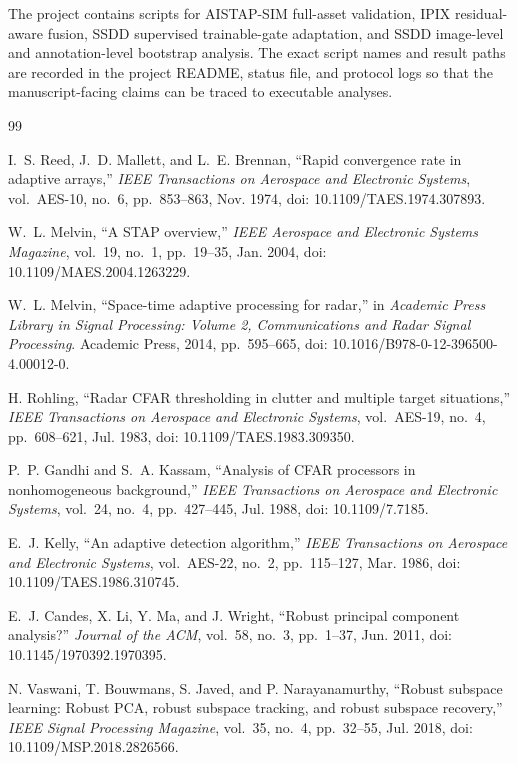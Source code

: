 \documentclass[journal]{IEEEtran}
\begin{document}
The project contains scripts for AISTAP-SIM full-asset validation, IPIX residual-aware fusion, SSDD supervised trainable-gate adaptation, and SSDD image-level and annotation-level bootstrap analysis. The exact script names and result paths are recorded in the project README, status file, and protocol logs so that the manuscript-facing claims can be traced to executable analyses.

\begin{thebibliography}{99}

I.~S. Reed, J.~D. Mallett, and L.~E. Brennan, ``Rapid convergence rate in adaptive arrays,'' \emph{IEEE Transactions on Aerospace and Electronic Systems}, vol.~AES-10, no.~6, pp.~853--863, Nov. 1974, doi: 10.1109/TAES.1974.307893.

W.~L. Melvin, ``A STAP overview,'' \emph{IEEE Aerospace and Electronic Systems Magazine}, vol.~19, no.~1, pp.~19--35, Jan. 2004, doi: 10.1109/MAES.2004.1263229.

W.~L. Melvin, ``Space-time adaptive processing for radar,'' in \emph{Academic Press Library in Signal Processing: Volume 2, Communications and Radar Signal Processing}. Academic Press, 2014, pp.~595--665, doi: 10.1016/B978-0-12-396500-4.00012-0.

H. Rohling, ``Radar CFAR thresholding in clutter and multiple target situations,'' \emph{IEEE Transactions on Aerospace and Electronic Systems}, vol.~AES-19, no.~4, pp.~608--621, Jul. 1983, doi: 10.1109/TAES.1983.309350.

P.~P. Gandhi and S.~A. Kassam, ``Analysis of CFAR processors in nonhomogeneous background,'' \emph{IEEE Transactions on Aerospace and Electronic Systems}, vol.~24, no.~4, pp.~427--445, Jul. 1988, doi: 10.1109/7.7185.

E.~J. Kelly, ``An adaptive detection algorithm,'' \emph{IEEE Transactions on Aerospace and Electronic Systems}, vol.~AES-22, no.~2, pp.~115--127, Mar. 1986, doi: 10.1109/TAES.1986.310745.

E.~J. Candes, X. Li, Y. Ma, and J. Wright, ``Robust principal component analysis?'' \emph{Journal of the ACM}, vol.~58, no.~3, pp.~1--37, Jun. 2011, doi: 10.1145/1970392.1970395.

N. Vaswani, T. Bouwmans, S. Javed, and P. Narayanamurthy, ``Robust subspace learning: Robust PCA, robust subspace tracking, and robust subspace recovery,'' \emph{IEEE Signal Processing Magazine}, vol.~35, no.~4, pp.~32--55, Jul. 2018, doi: 10.1109/MSP.2018.2826566.


\end{thebibliography}
\end{document}
